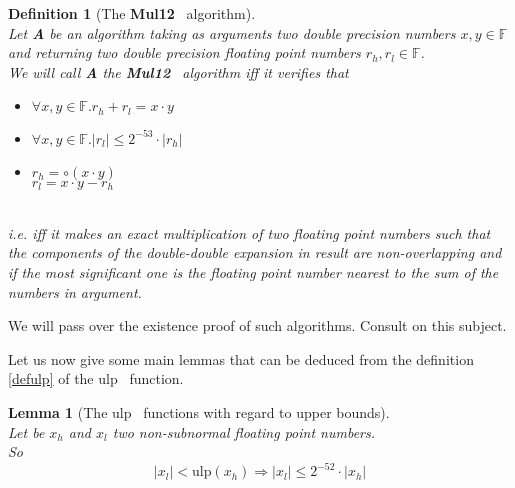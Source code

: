 \documentclass[a4paper,10pt,twoside]{article}
\newtheorem{lemma}[theorem]{Lemma}
\newtheorem{definition}[theorem]{Definition}
\newcommand{\F}{\ensuremath{\mathbb {F}}}
\newcommand{\hi}{\ensuremath{\mathit{h}}}
\newcommand{\lo}{\ensuremath{\mathit{l}}}
\newcommand{\Mul}{{\bf Mul12}}
\newcommand{\mUlp}{\ensuremath{\mathrm{ulp}}}
\begin{document}
\begin{definition}[The \Mul~ algorithm] \label{muldef} ~ \\
Let {\bf A} be an algorithm taking as arguments two double precision numbers $x,y \in \F$ and
returning two double precision floating point numbers $r_\hi, r_\lo \in \F$.\\
We will call {\bf A} the \Mul~ algorithm iff it verifies that\\
\begin{itemize}
\item $\forall x,y \in \F. r_\hi + r_\lo = x \cdot y$
\item $\forall x,y \in \F. \left \vert r_\lo \right \vert \leq 2^{-53} \cdot \left \vert r_\hi \right \vert$
\item $r_\hi = \circ\left( x \cdot y \right)$ \\
$r_\lo = x \cdot y - r_\hi$
\end{itemize} ~\\
i.e. iff it makes an exact multiplication of two floating point numbers such that
the components of the double-double expansion in result are non-overlapping
and if the most significant one is the floating point number nearest to the
sum of the numbers in argument.
\end{definition}
We will pass over the existence proof of such algorithms. Consult \cite{Dek71} on this subject. \par
Let us now give some main lemmas that can be deduced from the definition \ref{defulp} of the 
$\mUlp$~ function. 
\begin{lemma}[The $\mUlp$~ functions with regard to upper bounds] \label{ulpmajor} ~ \\
Let be $x_\hi$ and $x_\lo$ two non-subnormal floating point numbers. \\
So
$$\left \vert x_\lo \right \vert < \mUlp\left( x_\hi \right) \Rightarrow
\left \vert x_\lo \right \vert \leq 2^{-52} \cdot \left \vert x_\hi \right \vert$$
\end{lemma}
\end{document}
